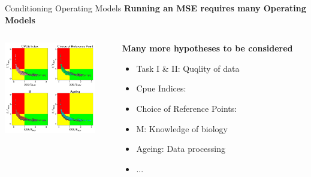 \documentclass{beamer}
\newcommand\Fontviii{\fontsize{8}{10}\selectfont}
\begin{document}
\begin{frame}{Conditioning Operating Models}
  \smallskip\textbf{Running an MSE requires many Operating Models}\smallskip\\
  \begin{columns}[t] %
   \begin{column}[T]{5cm} %
    \includegraphics[height=40mm]{kobeGrid.png}
   \end{column}
   \begin{column}[T]{5cm} %
   \Fontviii
   \smallskip\textbf{Many more hypotheses to be considered}\smallskip\\
   \begin{itemize}%
       \item {\color{blue} Task I \& II:} Quqlity of data
       \item {\color{blue} Cpue Indices:}
       \item {\color{blue} Choice of Reference Points:}
       \item {\color{blue} M:} Knowledge of biology
       \item {\color{blue} Ageing:} Data processing
       
       \item {\color{blue} ...}
   \end{itemize}
   \end{column}
\end{columns}
\end{frame}
\end{document}
